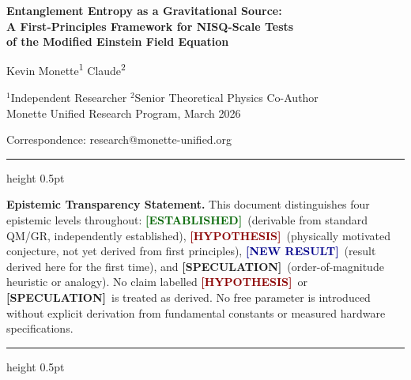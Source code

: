\documentclass[12pt,a4paper]{article}
\newcommand{\EST}{\textcolor{darkgreen}{\textbf{[ESTABLISHED]}}}
\newcommand{\HYP}{\textcolor{darkred}{\textbf{[HYPOTHESIS]}}}
\newcommand{\NEW}{\textcolor{darkblue}{\textbf{[NEW RESULT]}}}
\newcommand{\SPEC}{\textcolor{darkpurple}{\textbf{[SPECULATION]}}}
\theoremstyle{monette}
\theoremstyle{definition}
\begin{document}
\begin{center}
  {\LARGE\bfseries\sffamily\color{darkblue}
    Entanglement Entropy as a Gravitational Source:\\[6pt]
    A First-Principles Framework for NISQ-Scale Tests\\[6pt]
    of the Modified Einstein Field Equation}

  \vspace{16pt}

  {\large Kevin Monette\textsuperscript{1} \quad Claude\textsuperscript{2}}

  \vspace{8pt}

  {\normalsize
    $^{1}$Independent Researcher \quad
    $^{2}$Senior Theoretical Physics Co-Author\\[4pt]
    Monette Unified Research Program, March 2026}

  \vspace{8pt}

  {\small\ttfamily
    Correspondence: research@monette-unified.org}

  \vspace{12pt}

  \hrule height 0.5pt
  \vspace{6pt}

  \begin{minipage}{0.92\textwidth}
    \small\noindent
    \textbf{Epistemic Transparency Statement.}
    This document distinguishes four epistemic levels throughout:
    \EST\ (derivable from standard QM/GR, independently established),
    \HYP\ (physically motivated conjecture, not yet derived from first principles),
    \NEW\ (result derived here for the first time), and
    \SPEC\ (order-of-magnitude heuristic or analogy).
    No claim labelled \HYP\ or \SPEC\ is treated as derived.
    No free parameter is introduced without explicit derivation
    from fundamental constants or measured hardware specifications.
  \end{minipage}

  \vspace{6pt}
  \hrule height 0.5pt
\end{center}

\vspace{16pt}
\end{document}
